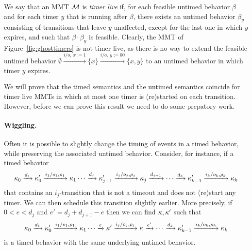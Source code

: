 We say that an MMT ${\cal M}$ is \emph{timer live} if, for each feasible untimed behavior $\beta$ and for each timer $y$ that is running after $\beta$, there exists an untimed behavior $\beta_y$ consisting of transitions that leave $y$ unaffected, except for the last one in which $y$ expires, and such that $\beta \cdot \beta_y$ is feasible.
Clearly, the MMT of Figure~\ref{fig:ghosttimers} is not timer live, as there is no way to extend the feasible untimed
behavior $\emptyset \xrightarrow{i/o,~ x:=1 } \{ x\} \xrightarrow{i/o,~ y:=60 } \{ x, y\}$ to an untimed behavior in which
timer $y$ expires.

We will prove that the timed semantics and the untimed semantics coincide for timer live MMTs in which at most one timer is (re)started on each transition. However, before we can prove this result we need to do some prepatory work.

\paragraph{Wiggling.}
Often it is possible to slightly change the timing of events in a timed behavior, 
while preserving the associated untimed behavior.
Consider, for instance, if a timed behavior 
\[
\kappa_0 \xrightarrow{d_1} \kappa'_0 \xrightarrow{i_1/o_1, \rho_1} \kappa_1 \cdots
\xrightarrow{d_j} \kappa'_{j-1} \xrightarrow{i_j/o_j, \rho_j} \kappa_j  \xrightarrow{d_{j+1}} \cdots
\xrightarrow{d_k} \kappa'_{k-1} \xrightarrow{i_k/o_k, \rho_k} \kappa_{k}
\]
that contains an $i_j$-transition that is not a timeout and does not (re)start any timer.
We can then schedule this transition slightly earlier.
More precisely, if $0 < e < d_j$ and $e' = d_j + d_{j+1}- e $ then we can find $\kappa, \kappa'$ such that
\[
\kappa_0 \xrightarrow{d_1} \kappa'_0 \xrightarrow{i_1/o_1, \rho_1} \kappa_1 \cdots
\xrightarrow{e} \kappa' \xrightarrow{i_j/o_j, \rho_j} \kappa  \xrightarrow{e'} \cdots
\xrightarrow{d_k} \kappa'_{k-1} \xrightarrow{i_k/o_k, \rho_k} \kappa_{k}
\]
is a timed behavior with the same underlying untimed behavior.

